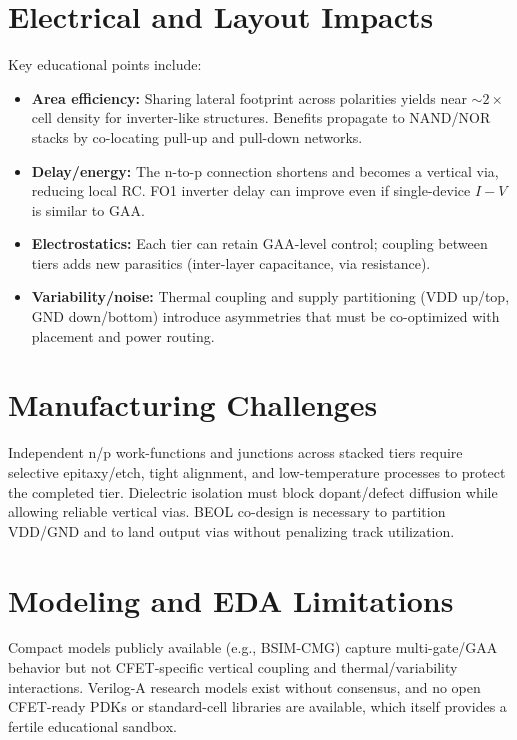 \documentclass[conference]{IEEEtran}
\begin{document}
\section{Electrical and Layout Impacts}
Key educational points include:
\begin{itemize}
  \item \textbf{Area efficiency:} Sharing lateral footprint across polarities yields near $\sim 2\times$ cell density for inverter-like structures. Benefits propagate to NAND/NOR stacks by co-locating pull-up and pull-down networks.
  \item \textbf{Delay/energy:} The n-to-p connection shortens and becomes a vertical via, reducing local RC. FO1 inverter delay can improve even if single-device $I\!-\!V$ is similar to GAA.
  \item \textbf{Electrostatics:} Each tier can retain GAA-level control; coupling between tiers adds new parasitics (inter-layer capacitance, via resistance).
  \item \textbf{Variability/noise:} Thermal coupling and supply partitioning (VDD up/top, GND down/bottom) introduce asymmetries that must be co-optimized with placement and power routing.
\end{itemize}

\section{Manufacturing Challenges}
Independent n/p work-functions and junctions across stacked tiers require selective epitaxy/etch, tight alignment, and low-temperature processes to protect the completed tier.
Dielectric isolation must block dopant/defect diffusion while allowing reliable vertical vias.
BEOL co-design is necessary to partition VDD/GND and to land output vias without penalizing track utilization.

\section{Modeling and EDA Limitations}
Compact models publicly available (e.g., BSIM-CMG) capture multi-gate/GAA behavior but not CFET-specific vertical coupling and thermal/variability interactions.
Verilog-A research models exist without consensus, and no open CFET-ready PDKs or standard-cell libraries are available, which itself provides a fertile educational sandbox.\nocite{*}
\end{document}
